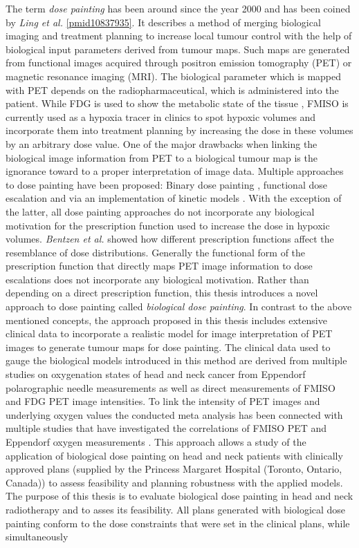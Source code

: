 The term \textit{dose painting} has been around since the year 2000 and has been coined by \textit{Ling et al.} \ref{pmid10837935}. It describes a method of merging biological imaging and treatment planning to increase local tumour control with the help of biological input parameters derived from tumour maps. Such maps are generated from functional images acquired through positron emission tomography (PET) or magnetic resonance imaging (MRI). The biological parameter which is mapped with PET depends on the radiopharmaceutical, which is administered into the patient. While FDG is used to show the metabolic state of the tissue \cite{pmid16841141}, FMISO is currently used as a hypoxia tracer in clinics to spot hypoxic volumes and incorporate them into treatment planning by increasing the dose in these volumes by an arbitrary dose value. One of the major drawbacks when linking the biological image information from PET to a biological tumour map is the ignorance toward to a proper interpretation of image data. Multiple approaches to dose painting have been proposed: Binary dose painting \cite{pmid20855118, pmid11240261, pmid17869020}, functional dose escalation \cite{pmid12587912, pmid21356478, pmid20643512, pmid18635895} and via an implementation of kinetic models \cite{pmid17448882}. With the exception of the latter, all dose painting approaches do not incorporate any biological motivation for the prescription function used to increase the dose in hypoxic volumes. \textit{Bentzen et al.} \cite{pmid19218733} showed how different prescription functions affect the resemblance of dose distributions. Generally the functional form of the prescription function that directly maps PET image information to dose escalations does not incorporate any biological motivation. Rather than depending on a direct prescription function, this thesis introduces a novel approach to dose painting called \textit{biological dose painting}. In contrast to the above mentioned concepts, the approach proposed in this thesis includes extensive clinical data to incorporate a realistic model for image interpretation of PET images to generate tumour maps for dose painting. The clinical data used to gauge the biological models introduced in this method are derived from multiple studies on oxygenation states of head and neck cancer from Eppendorf polarographic needle measurements as well as direct measurements of FMISO and FDG PET image intensities. To link the intensity of PET images and underlying oxygen values the conducted meta analysis has been connected with multiple studies that have investigated the correlations of FMISO PET and Eppendorf oxygen measurements \cite{pmid17598907, pmid12865184, pmid20831480}. This approach allows a study of the application of biological dose painting on head and neck patients with clinically approved plans (supplied by the Princess Margaret Hospital (Toronto, Ontario, Canada)) to assess feasibility and planning robustness with the applied models.\\The purpose of this thesis is to evaluate biological dose painting in head and neck radiotherapy and to asses its feasibility. All plans generated with biological dose painting conform to the dose constraints that were set in the clinical plans, while simultaneously 